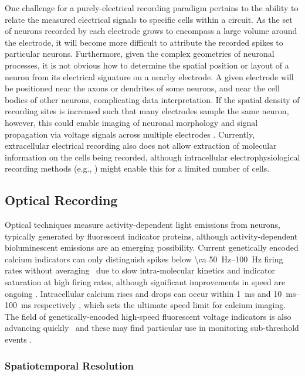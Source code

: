 One challenge for a purely-electrical recording paradigm pertains to the ability to relate the measured electrical signals to specific cells within a circuit.
As the set of neurons recorded by each electrode grows to encompass a large volume around the electrode, it will become more difficult to attribute the recorded spikes to particular neurons.
Furthermore, given the complex geometries of neuronal processes, it is not obvious how to determine the spatial position or layout of a neuron from its electrical signature on a nearby electrode. A given electrode will be positioned near the axons or dendrites of some neurons, and near the cell bodies of other neurons, complicating data interpretation. If the spatial density of recording sites is increased such that many electrodes sample the same neuron, however, this could enable imaging of neuronal morphology and signal propagation via voltage signals across multiple electrodes \cite{bakkum2013tracking}. Currently, extracellular electrical recording also does not allow extraction of molecular information on the cells being recorded, although intracellular electrophysiological recording methods (e.g., \cite{Kodandaramaiah2012}) might enable this for a limited number of cells.

\subsection{Optical Recording}

Optical techniques measure activity-dependent light emissions from neurons, typically generated by fluorescent indicator proteins, although activity-dependent bioluminescent emissions are an emerging possibility.
Current genetically encoded calcium indicators can only distinguish spikes below \SIrange{\ca 50}{100}{\hertz} firing rates without averaging~\cite{Smetters99} due to slow intra-molecular kinetics and indicator saturation at high firing rates, although significant improvements in speed are ongoing \cite{sun2013fast}. Intracellular calcium rises and drops can occur within \SI{1}{\milli\second} and \SIrange{10}{100}{\milli\second} respectively \cite{higley2008calcium}, which sets the ultimate speed limit for calcium imaging. The field of genetically-encoded high-speed fluorescent voltage indicators is also advancing quickly~\cite{Barnett2012, Kralj2012,gong2013enhanced, Storace2013, cao2013genetically} and these may find particular use in monitoring sub-threshold events \cite{scanziani2009electrophysiology}.

\subsubsection{Spatiotemporal Resolution}

